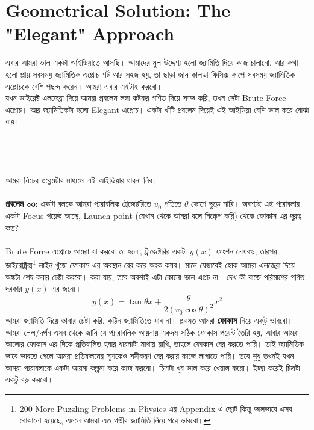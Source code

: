 \documentclass[12pt,a4paper]{article}
\begin{document}
\section{Geometrical Solution: The "Elegant" Approach }
এবার আমরা ভাল একটা আইডিয়াতে আসছি। আমাদের মুল উদ্দেশ্য হলো জ্যামিতি দিয়ে কাজ চালানো, আর কথা হলো প্রায় সবসময় জ্যামিতিক এপ্রোচ শর্ট আর সহজ হয়, তা ছাড়া জান কালডা ফিসিক্স কাপে সবসময় জ্যামিতিক এপ্রোচকে বেশি পছন্দ করেন। আমরা এবার এইটাই করবো। \\
যখন ডাইরেক্ট এলজেব্রা দিয়ে আমরা প্রবলেম লম্বা কষ্টকর গণিত দিয়ে সল্ভ করি, তখন সেটা Brute Force এপ্রোচ। আর জ্যামিতিকটা হলো Elegant এপ্রোচ। একটা খাঁটি প্রবলেম দিয়েই এই আইডিয়া বেশি ভাল করে বোঝা যায়।\\
\\
 \\
\\
\\
আমরা নিচের প্রব্লেমটার মাধ্যমে এই আইডিয়ার ধারনা নিব।\\
\\
\textbf{প্রবলেম ০৩:} একটা বলকে আমরা প্যরাবলিক ট্রেজেক্টরিতে $v_0$ গতিতে $\theta$ কোণে ছুড়ে মারি। অবশ্যই এই প্যরাবলার একটা Focus পয়েন্ট আছে, Launch point (যেখান থেকে আমরা বলে নিক্কেপ করি) থেকে ফোকাস এর দূরত্ব কত?\\
\\
Brute Force এপ্রোচে আমরা যা করবো তা হলো, ট্রাজেক্টরির একটা $y(x)$ ফাংশন লেখবও, তারপর ডাইরেক্ট্রিক্স\footnote{200 More Puzzling Problems in Physics এর Appendix এ ছোট কিন্তু ভালভাবে এসব বোঝানো হয়েছে, এমনে আমরা এত গভীর জ্যামিতি নিয়ে পরে ভাববো।} লাইন খুঁজে ফোকাস এর অবস্থান বের করে অংক কষব। মানে যেভাবেই হোক আমরা এলজেব্রা দিয়ে অঙ্কটা শেষ করার চেষ্টা করবো। করা যায়, তবে অবশ্যই এটা কোনো ভাল এপ্রচ না। দেখ কী বাজে পরিমাণের গণিত দরকার $y(x)$ এর জন্যে। 
\begin{equation}
y(x) = \tan \theta x 
+
\frac{g}{2(v_0 \cos \theta)^2} x^2
\end{equation}
আমরা জ্যামিতি দিয়ে ভাবার চেষ্টা করি, কঠিন জ্যামিতিতে যাব না। প্রথমত আমরা \textbf{ফোকাস} নিয়ে একটু ভাববো। আমরা লেন্স/দর্পন এসব থেকে জানি যে প্যারাবলিক আয়নায় একদম সঠিক ফোকাস পয়েন্ট তৈরি হয়, আবার আমরা আলোর ফোকাস এর দিকে প্রতিফলিত হবার ধারনাটা মাথায় রাখি, তাহলে ফোকাস বের করতে পারি। তাই জ্যামিতিক ভাবে ভাবতে গেলে আমরা প্রতিফলনের সূত্রকেও সমীকরণ বের করার কাজে লাগাতে পারি। তবে শুধু তখনই যখন আমরা প্যরাবলাকে একটা আয়না কল্পনা করে কাজ করবো। চিত্রটা খুব ভাল করে খেয়াল করো। ইচ্ছা করেই চিত্রটা একটু বড় করবো।\\
\end{document}
